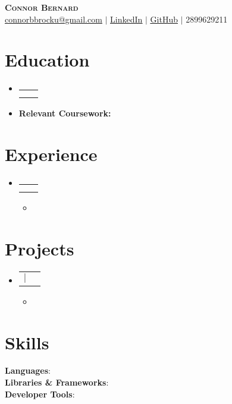\documentclass[letterpaper,11pt]{article}
\makeatletter
\newcommand{\resumeItem}[1]{
  \item\small{
    {#1 \vspace{-2pt}}
  }
}
\newcommand{\resumeSubheading}[4]{
  \vspace{-2pt}\item
    \begin{tabular*}{0.97\textwidth}[t]{l@{\extracolsep{\fill}}r}
      \textbf{#1} & #2 \\
      \textit{\small#3} & \textit{\small #4} \\
    \end{tabular*}\vspace{-7pt}
}
\newcommand{\resumeProjectHeading}[2]{
    \item
    \begin{tabular*}{0.97\textwidth}{l@{\extracolsep{\fill}}r}
      \small#1 & #2 \\
    \end{tabular*}\vspace{-7pt}
}
\newcommand{\resumeSubHeadingListStart}{\begin{itemize}[leftmargin=0.15in, label={}]}
\newcommand{\resumeSubHeadingListEnd}{\end{itemize}}
\newcommand{\resumeItemListStart}{\begin{itemize}}
\newcommand{\resumeItemListEnd}{\end{itemize}\vspace{-5pt}}
\makeatother
\begin{document}
\begin{center}
    \textbf{\Huge \scshape Connor Bernard} 
    \\ \vspace{1pt} 
    \href{mailto:connorbbrocku@gmail.com}{\underline{connorbbrocku@gmail.com}} 
    $|$ \href{https://linkedin.com/in/connor-bernard/}{\underline{LinkedIn}}
    $|$ \href{https://github.com/condyl}{\underline{GitHub}}
    $|$ 2899629211
\end{center}

\section{Education}
\resumeSubHeadingListStart

    \resumeSubheading
      {}{}
      {}{}
    \resumeItem
    {\textbf{Relevant Coursework:} }
    
\resumeSubHeadingListEnd

\section{Experience}
\resumeSubHeadingListStart

    \resumeSubheading
      {}{}
      {}{}
      \resumeItemListStart
        \resumeItem{}
        \resumeItemListEnd
    
\resumeSubHeadingListEnd

\section{Projects}
\resumeSubHeadingListStart

        \resumeProjectHeading
          {\textbf{\href{}{\underline{}}} $|$ \emph{}}{}
          \resumeItemListStart
            \resumeItem{}
            \resumeItemListEnd
        
\resumeSubHeadingListEnd

\section{Skills}

\begin{itemize}[leftmargin=0.15in, label={}]
\small{\item{
\textbf{Languages}:  \\
\textbf{Libraries \& Frameworks}:  \\
\textbf{Developer Tools}: 
}}
\end{itemize}
\end{document}
